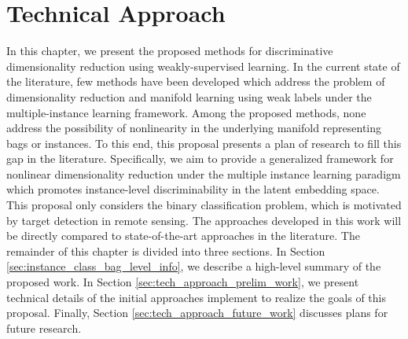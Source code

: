\chapter{Technical Approach}
In this chapter, we present the proposed methods for discriminative dimensionality reduction using weakly-supervised learning. In the current state of the literature, few methods have been developed which address the problem of dimensionality reduction and manifold learning using weak labels under the multiple-instance learning framework.  Among the proposed methods, none address the possibility of nonlinearity in the underlying manifold representing bags or instances. To this end, this proposal presents a plan of research to fill this gap in the literature.  Specifically, we aim to provide a generalized framework for nonlinear dimensionality reduction under the multiple instance learning paradigm which promotes instance-level discriminability in the latent embedding space.  This proposal only considers the binary classification problem, which is motivated by target detection in remote  sensing. The approaches developed in this work will be directly compared to state-of-the-art approaches in the literature.  The remainder of this chapter is divided into three sections.  In Section \ref{sec:instance_class_bag_level_info}, we describe a high-level summary of the proposed work.  In Section \ref{sec:tech_approach_prelim_work}, we present technical details of the initial approaches implement to realize the goals of this proposal.  Finally, Section \ref{sec:tech_approach_future_work} discusses plans for future research. 

